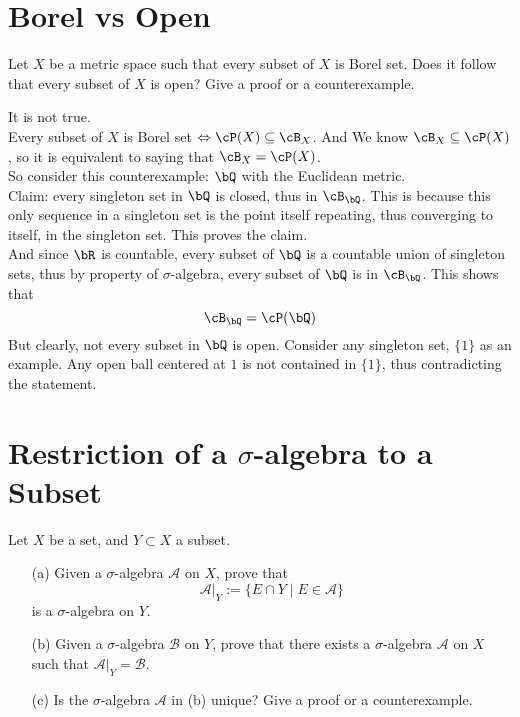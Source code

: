 \documentclass[lang=cn,11pt]{elegantbook}
\begin{document}
\section{Borel vs Open}
Let $X$ be a metric space such that every subset of $X$ is Borel set. Does it follow that every subset of $X$ is open? Give a proof or a counterexample.
\begin{solution}
    It is not true.\\
    Every subset of $X$ is Borel set $\Leftrightarrow \cP(X) \sub \cB_X$. And We know $\cB_X \sub \cP(X)$, so it is equivalent to saying that $\cB_X = \cP(X)$.\\
    So consider this counterexample: $\bQ$ with the Euclidean metric.\\
    Claim: every singleton set in $\bQ$ is closed, thus in $\cB_\bQ$.
    This is because this only sequence in a singleton set is the point itself repeating, thus converging to itself, in the singleton set. This proves the claim.\\
    And since $\bR$ is countable, every subset of $\bQ$ is a countable union of singleton sets, thus by property of $\sigma$-algebra, every subset of $\bQ$ is in $\cB_{\bQ}$. This shows that 
    $$
    \cB_\bQ = \cP(\bQ)
    $$
    But clearly, not every subset in $\bQ$ is open. Consider any singleton set, $\{1\}$ as an example. Any open ball centered at $1$ is not contained in $\{1\}$, thus contradicting the statement.
    
\end{solution}

\section{Restriction of a $\sigma$-algebra to a Subset}
Let $X$ be a set, and $Y \subset X$ a subset.

\begin{itemize}
    \item[(a)] Given a $\sigma$-algebra $\mathcal{A}$ on $X$, prove that
    \[
    \mathcal{A}|_Y := \{E \cap Y \mid E \in \mathcal{A}\}
    \]
    is a $\sigma$-algebra on $Y$.
    \item[(b)] Given a $\sigma$-algebra $\mathcal{B}$ on $Y$, prove that there exists a $\sigma$-algebra $\mathcal{A}$ on $X$ such that $\mathcal{A}|_Y = \mathcal{B}$.
    \item[(c)] Is the $\sigma$-algebra $\mathcal{A}$ in (b) unique? Give a proof or a counterexample.
\end{itemize}
\end{document}
